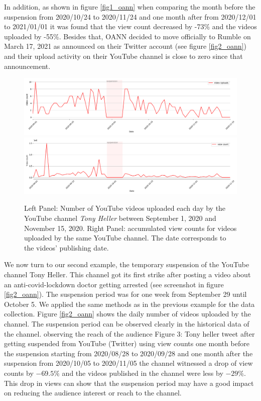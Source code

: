 \documentclass{article}
\begin{document}
In addition, as shown in figure \ref{fig1_oann} when comparing the month before the suspension from 2020/10/24 to 2020/11/24 and one month after from 2020/12/01 to 2021/01/01 it was found that the view count decreased by -73\% and the videos uploaded by -55\%. Besides that, OANN decided to move officially to Rumble on March 17, 2021 as announced on their Twitter account (see figure \ref{fig2_oann}) and their upload activity on their YouTube channel is close to zero since that announcement. 

\begin{figure}[h]
	\centering
			\includegraphics[scale=0.26]{../figure/Tony_Heller_videos_yt.png}
			\includegraphics[scale=0.26]{../figure/Tony_Heller_views_yt.png}
	\caption{Left Panel: Number of YouTube videos uploaded each day by the YouTube channel {\it Tony Heller} between September 1, 2020 and November 15, 2020. Right Panel: accumulated view counts for videos uploaded by the same YouTube channel. The date corresponds to the videos’  publishing date. 
}
	\label{fig1_tony}
\end{figure}

We now turn to our second example, the temporary suspension of the YouTube channel Tony Heller. This channel got its first strike after posting a video about an anti-covid-lockdown doctor getting arrested (see screenshot in figure \ref{fig2_oann}). The suspension period was for one week from September 29 until October 5. We applied the same methods as in the previous example for the data collection. Figure \ref{fig2_oann} shows the daily number of videos uploaded by the channel. The suspension period can be observed clearly in the historical data of the channel.  observing the reach of the audience 
Figure 3: Tony heller tweet after getting suspended from YouTube (Twitter)
using view counts one month before the suspension starting from 2020/08/28 to 2020/09/28 and one month after the suspension from 2020/10/05 to 2020/11/05 the channel witnessed a drop of view counts by $-69.5\%$ and the videos published in the channel were less by $-29\%$. This drop in views can show that the  suspension  period
may  have  a  good  impact  on  reducing  the  audience interest or reach to the channel.
\end{document}
